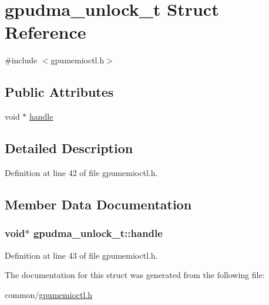 \hypertarget{structgpudma__unlock__t}{
\section{gpudma\_\-unlock\_\-t Struct Reference}
\label{structgpudma__unlock__t}
}


{\ttfamily \#include $<$gpumemioctl.h$>$}\subsection*{Public Attributes}
\begin{DoxyCompactItemize}
\item 
void $\ast$ \hyperlink{structgpudma__unlock__t_ad10027324aed6d13ed3e6c935c0f0787}{handle}
\end{DoxyCompactItemize}


\subsection{Detailed Description}


Definition at line 42 of file gpumemioctl.h.

\subsection{Member Data Documentation}
\hypertarget{structgpudma__unlock__t_ad10027324aed6d13ed3e6c935c0f0787}{
\subsubsection[{handle}]{\setlength{\rightskip}{0pt plus 5cm}void$\ast$ {\bf gpudma\_\-unlock\_\-t::handle}}}
\label{structgpudma__unlock__t_ad10027324aed6d13ed3e6c935c0f0787}


Definition at line 43 of file gpumemioctl.h.

The documentation for this struct was generated from the following file:\begin{DoxyCompactItemize}
\item 
common/\hyperlink{gpumemioctl_8h}{gpumemioctl.h}\end{DoxyCompactItemize}
